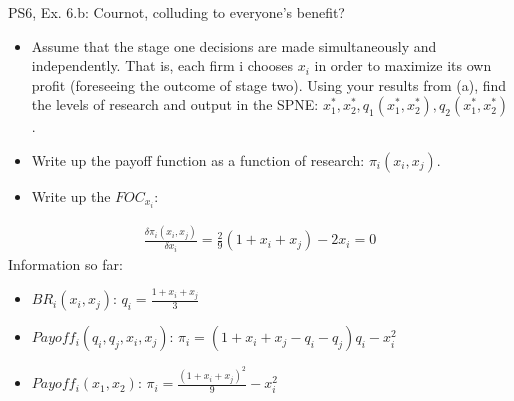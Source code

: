 \begin{frame}{PS6, Ex. 6.b: Cournot, colluding to everyone's benefit?}
    \begin{itemize}
    \item[(b)] Assume that the stage one decisions are made simultaneously and independently. That is, each firm i chooses $x_i$ in order to maximize its own profit (foreseeing the outcome of stage two). Using your results from (a), find the levels of research and output in the SPNE: $x_1^*,x_2^*,q_1(x_1^*,x_2^*),q_2(x_1^*,x_2^*)$.
    \end{itemize}
    \vfill\null
  \begin{multicols}{2}
    \begin{itemize}
      \item[(Step a)] Write up the payoff function as a function of research: $\pi_i(x_i,x_j)$.
      \item[(Step b)] Write up the $FOC_{x_i}:$
    \end{itemize}
    \begin{align*}
      \frac{\delta\pi_i(x_i,x_j)}{\delta x_i}=\frac{2}{9}(1+x_i+x_j)-2x_i=0
    \end{align*}
    \vfill\null \columnbreak
    Information so far:
    \begin{itemize}
    \item[1] $BR_i(x_i,x_j)$: $q_i = \frac{1+x_i+x_j}{3}$
    \item[2] $Payoff_i(q_i,q_j,x_i,x_j)$: $\pi_i=(1+x_i+x_j-q_i-q_j)q_i-x_i^2$
    \item[3] $Payoff_i(x_1,x_2)$: $\pi_i=\frac{(1+x_i+x_j)^2}{9}-x_i^2$
    \end{itemize}
    \vfill\null
  \end{multicols}
\end{frame}
